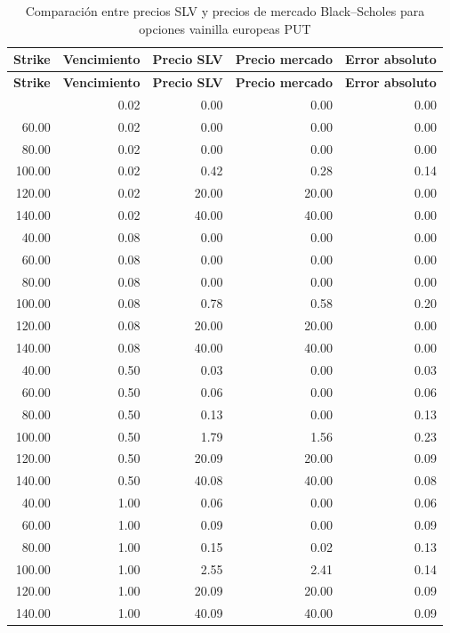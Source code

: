 \clearpage
\begingroup
\scriptsize
\renewcommand{\arraystretch}{0.82}
\setlength{\tabcolsep}{4pt}
\begin{longtable}{@{}rrrrr@{}}
\caption{Comparación entre precios SLV y precios de mercado Black--Scholes para opciones vainilla europeas PUT}\label{tab:slv_ref_put}\\
\toprule
\textbf{Strike} & \textbf{Vencimiento} & \textbf{Precio SLV} & \textbf{Precio mercado} & \textbf{Error absoluto} \\
\midrule
\endfirsthead
\toprule
\textbf{Strike} & \textbf{Vencimiento} & \textbf{Precio SLV} & \textbf{Precio mercado} & \textbf{Error absoluto} \\
\midrule
\endhead
\bottomrule
\endlastfoot
40.00  & 0.02  & 0.00 & 0.00 & 0.00 \\
60.00  & 0.02  & 0.00 & 0.00 & 0.00 \\
80.00  & 0.02  & 0.00 & 0.00 & 0.00 \\
100.00 & 0.02  & 0.42 & 0.28 & 0.14 \\
120.00 & 0.02  & 20.00 & 20.00 & 0.00 \\
140.00 & 0.02  & 40.00 & 40.00 & 0.00 \\
40.00  & 0.08  & 0.00 & 0.00 & 0.00 \\
60.00  & 0.08  & 0.00 & 0.00 & 0.00 \\
80.00  & 0.08  & 0.00 & 0.00 & 0.00 \\
100.00 & 0.08  & 0.78 & 0.58 & 0.20 \\
120.00 & 0.08  & 20.00 & 20.00 & 0.00 \\
140.00 & 0.08  & 40.00 & 40.00 & 0.00 \\
40.00  & 0.50  & 0.03 & 0.00 & 0.03 \\
60.00  & 0.50  & 0.06 & 0.00 & 0.06 \\
80.00  & 0.50  & 0.13 & 0.00 & 0.13 \\
100.00 & 0.50  & 1.79 & 1.56 & 0.23 \\
120.00 & 0.50  & 20.09 & 20.00 & 0.09 \\
140.00 & 0.50  & 40.08 & 40.00 & 0.08 \\
40.00  & 1.00  & 0.06 & 0.00 & 0.06 \\
60.00  & 1.00  & 0.09 & 0.00 & 0.09 \\
80.00  & 1.00  & 0.15 & 0.02 & 0.13 \\
100.00 & 1.00  & 2.55 & 2.41 & 0.14 \\
120.00 & 1.00  & 20.09 & 20.00 & 0.09 \\
140.00 & 1.00  & 40.09 & 40.00 & 0.09 \\

\end{longtable}
